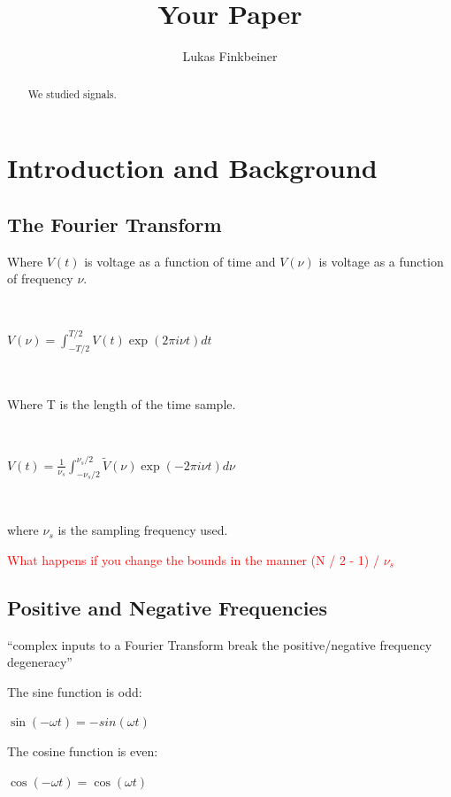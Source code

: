 \documentclass[a4paper]{article}
\title{Your Paper}
\author{Lukas Finkbeiner}
\begin{document}
\maketitle

\begin{abstract}

We studied signals.

\end{abstract}


\section{Introduction and Background}

\subsection{The Fourier Transform}

Where $V(t)$ is voltage as a function of time and $V(\nu)$ is voltage as a function of frequency $\nu$.

\

$V(\nu) = \int_{-T / 2}^{T / 2} V(t) \exp(2 \pi i \nu t) dt$

\

Where T is the length of the time sample.

\

$V(t) = \frac{1}{\nu_s} \int_{- \nu_s / 2}^{\nu_s / 2} \tilde{V}(\nu) \exp(-2 \pi i \nu t) d \nu$

\

where $\nu_s$ is the sampling frequency used.

\textcolor{red}{What happens if you change the bounds in the manner (N / 2 - 1) / $\nu_s$}


\subsection{Positive and Negative Frequencies}

``complex inputs to a Fourier Transform break the positive/negative frequency degeneracy''

The sine function is odd:

$\sin(-\omega t) = -sin(\omega t)$

The cosine function is even:

$\cos(-\omega t) = \cos (\omega t)$
\end{document}
